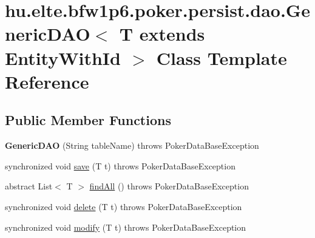 \hypertarget{classhu_1_1elte_1_1bfw1p6_1_1poker_1_1persist_1_1dao_1_1_generic_d_a_o}{}\section{hu.\+elte.\+bfw1p6.\+poker.\+persist.\+dao.\+Generic\+D\+A\+O$<$ T extends Entity\+With\+Id $>$ Class Template Reference}
\label{classhu_1_1elte_1_1bfw1p6_1_1poker_1_1persist_1_1dao_1_1_generic_d_a_o}
\subsection*{Public Member Functions}
\begin{DoxyCompactItemize}
\item 
\hypertarget{classhu_1_1elte_1_1bfw1p6_1_1poker_1_1persist_1_1dao_1_1_generic_d_a_o_ad1da1ce88e5a3a83646c3e0d253fa610}{}{\bfseries Generic\+D\+A\+O} (String table\+Name)  throws Poker\+Data\+Base\+Exception \label{classhu_1_1elte_1_1bfw1p6_1_1poker_1_1persist_1_1dao_1_1_generic_d_a_o_ad1da1ce88e5a3a83646c3e0d253fa610}

\item 
synchronized void \hyperlink{classhu_1_1elte_1_1bfw1p6_1_1poker_1_1persist_1_1dao_1_1_generic_d_a_o_a4de95f15738a8729d66290d021a2f8c0}{save} (T t)  throws Poker\+Data\+Base\+Exception 
\item 
abstract List$<$ T $>$ \hyperlink{classhu_1_1elte_1_1bfw1p6_1_1poker_1_1persist_1_1dao_1_1_generic_d_a_o_ac242d08c50a5ec259082538c538891b7}{find\+All} ()  throws Poker\+Data\+Base\+Exception
\item 
synchronized void \hyperlink{classhu_1_1elte_1_1bfw1p6_1_1poker_1_1persist_1_1dao_1_1_generic_d_a_o_ac6290cd4c1ebe0c8069fc3aba8f377d2}{delete} (T t)  throws Poker\+Data\+Base\+Exception 
\item 
synchronized void \hyperlink{classhu_1_1elte_1_1bfw1p6_1_1poker_1_1persist_1_1dao_1_1_generic_d_a_o_a68d51201957fee470c3b25ba512a89a2}{modify} (T t)  throws Poker\+Data\+Base\+Exception 
\end{DoxyCompactItemize}
